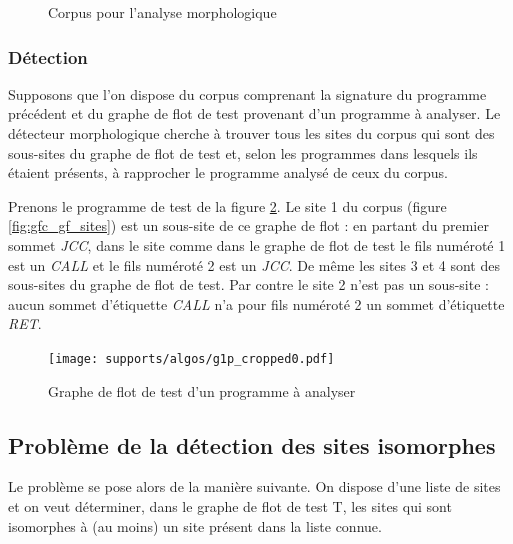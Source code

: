 \begin{figure}[h]
\begin{center}
{
}
\end{center}
\caption{Corpus pour l'analyse morphologique}
\label{fig:corpus}
\end{figure}

\subsubsection{Détection}
Supposons que l'on dispose du corpus comprenant la signature du programme précédent et du graphe de flot de test provenant d'un programme à analyser.
Le détecteur morphologique cherche à trouver tous les sites du corpus qui sont des sous-sites du graphe de flot de test et, selon les programmes dans lesquels ils étaient présents, à rapprocher le programme analysé de ceux du corpus.

Prenons le programme de test de la figure \ref{fig:am_exemple_gf_test}.
Le site 1 du corpus (figure \ref{fig:gfc_gf_sites}) est un sous-site de ce graphe de flot : en partant du premier sommet \emph{JCC}, dans le site comme dans le graphe de flot de test le fils numéroté 1 est un \emph{CALL} et le fils numéroté 2 est un \emph{JCC}.
De même les sites 3 et 4 sont des sous-sites du graphe de flot de test. Par contre le site 2 n'est pas un sous-site : aucun sommet d'étiquette \emph{CALL} n'a pour fils numéroté 2 un sommet d'étiquette \emph{RET}.

\begin{figure}[h]
\begin{center}
\texttt{[image: supports/algos/g1p\_cropped0.pdf]}
\end{center}
\caption{Graphe de flot de test d'un programme à analyser}
\label{fig:am_exemple_gf_test}
\end{figure}

\FloatBarrier
\subsection{Problème de la détection des sites isomorphes}
Le problème se pose alors de la manière suivante. On dispose d'une liste de sites et %
on veut déterminer, dans le graphe de flot de test T, les sites qui sont isomorphes à (au moins) un site présent dans la liste connue. 


